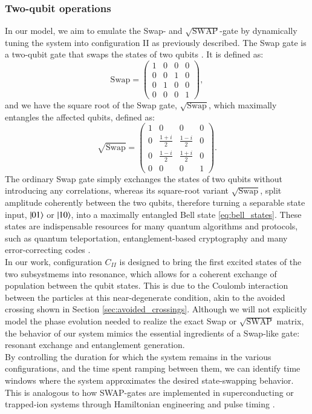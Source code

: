 \documentclass{subfiles}
\begin{document}
\subsubsection*{Two-qubit operations}
In our model, we aim to emulate the Swap- and $\sqrt{\text{SWAP}}$-gate by dynamically tuning the system into configuration II as previously described. The Swap gate is a two-qubit gate that swaps the states of two qubits \cite{nielsen2010quantum}. It is defined as:
\begin{equation}
    \text{Swap} = \begin{pmatrix}
    1 & 0 & 0 & 0 \\
    0 & 0 & 1 & 0 \\
    0 & 1 & 0 & 0 \\
    0 & 0 & 0 & 1
    \end{pmatrix} \label{eq:swap_gate},
\end{equation}
and we have the square root of the Swap gate, $\sqrt{\text{Swap}}$, which maximally entangles the affected qubits, defined as:
\begin{equation}
    \sqrt{\text{Swap}} = \begin{pmatrix}
    1 & 0 & 0 & 0 \\
    0 & \frac{1+i}{2} & \frac{1-i}{2} & 0 \\
    0 & \frac{1-i}{2} & \frac{1+i}{2} & 0 \\
    0 & 0 & 0 & 1
    \end{pmatrix} \label{eq:sqrt_swap_gate}.
\end{equation}
The ordinary Swap gate simply exchanges the states of two qubits without introducing any correlations, whereas its square-root variant $\sqrt{\text{Swap}}$, split amplitude coherently between the two qubits, therefore turning a separable state input, $\ket{01}$ or $\ket{10}$, into a maximally entangled Bell state \eqref{eq:bell_states}. These states are indispensable resources for many quantum algorithms and protocols, such as quantum teleportation, entanglement-based cryptography and many error-correcting codes \cite{nielsen2010quantum, bouwmeester1997experimental, yin2020entanglement}. 
\\
In our work, configuration $C_{II}$ is designed to bring the first excited states of the two subsystmems into resonance, which allows for a coherent exchange of population between the qubit states. This is due to the Coulomb interaction between the particles at this near-degenerate condition, akin to the avoided crossing shown in Section \ref{sec:avoided_crossings}. Although we will not explicitly model the phase evolution needed to realize the exact Swap or $\sqrt{\text{SWAP}}$ matrix, the behavior of our system mimics the essential ingredients of a Swap-like gate: resonant exchange and entanglement generation. \\
By controlling the duration for which the system remains in the various configurations, and the time spent ramping between them, we can identify time windows where the system approximates the desired state-swapping behavior. This is analogous to how SWAP-gates are implemented in superconducting or trapped-ion systems through Hamiltonian engineering and pulse timing \cite{picard2025entanglement}. \\
\end{document}
